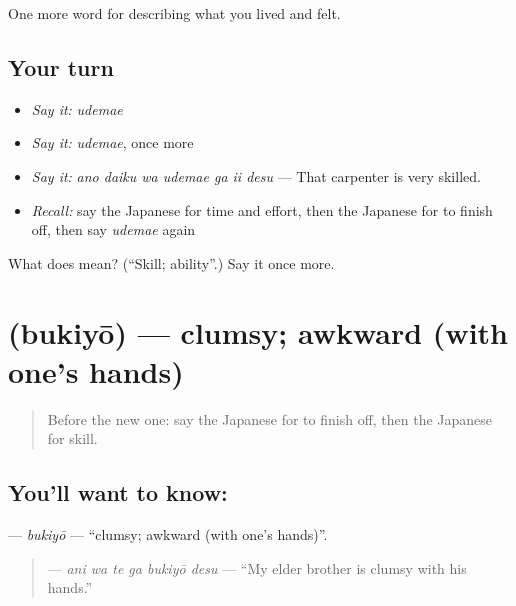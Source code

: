 \begin{grammarlens}[title={What you've built}]
One more word for describing what you lived and felt.
\end{grammarlens}

\subsection*{Your turn}
\begin{itemize}
\raggedright
  \item \emph{Say it:} \emph{udemae}
  \item \emph{Say it:} \emph{udemae}, once more
  \item \emph{Say it:} \emph{ano daiku wa udemae ga ii desu} — That carpenter is very skilled.
  \item \emph{Recall:} say the Japanese for time and effort, then the Japanese for to finish off, then say \emph{udemae} again
\end{itemize}

\begin{tcolorbox}[breakable,colback=teal!4,colframe=teal!35!black,title={Before you move on}]
What does  mean? (\textquotedblleft{}Skill; ability\textquotedblright{}.) Say it once more.
\end{tcolorbox}
\section[\texorpdfstring{\ja{ぶきよう} (bukiyō)}{ぶきよう (bukiyō)}]{ (bukiyō) — clumsy; awkward (with one's hands)}

\label{lesson:JA-C481-bukiyou}



\begin{quote}
Before the new one: say the Japanese for to finish off, then the Japanese for skill.
\end{quote}

\subsection*{You'll want to know: }
\textbf{} — \emph{bukiyō} — \textquotedblleft{}clumsy; awkward (with one's hands)\textquotedblright{}.

\begin{quote}
\textbf{  } — \emph{ani wa te ga bukiyō desu} — \textquotedblleft{}My elder brother is clumsy with his hands.\textquotedblright{}
\end{quote}

